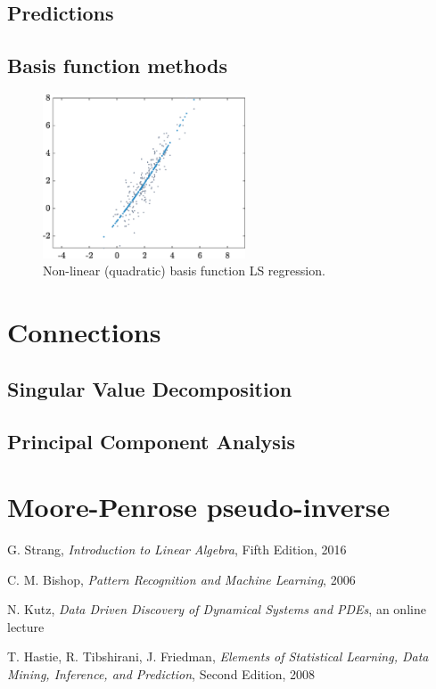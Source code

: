 \documentclass[10pt,twocolumn]{article}
\begin{document}
\subsection{Predictions}

\subsection{Basis function methods}

\begin{figure}[H]
\centering\includegraphics[width=6cm]{LS-nonlinear-basis-functions.eps}
\caption{Non-linear (quadratic) basis function LS regression.}
\label{fig:LS-linear-basis}
\end{figure}









\section{Connections}

\subsection{Singular Value Decomposition}

\subsection{Principal Component Analysis}

\section{Moore-Penrose pseudo-inverse}


\newpage


\thebibliography{}



 G. Strang, \textit{Introduction to Linear Algebra}, Fifth Edition, 2016

 C. M. Bishop, \textit{Pattern Recognition and Machine Learning}, 2006

 N. Kutz, \textit{Data Driven Discovery of Dynamical Systems and PDEs}, an online lecture 

 T. Hastie, R. Tibshirani, J. Friedman, \textit{Elements of Statistical Learning, Data Mining, Inference, and Prediction}, Second Edition, 2008

 \label{bib:pope}
\end{document}

